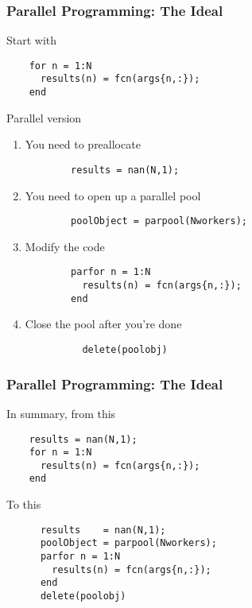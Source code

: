 \documentclass{beamer}
\begin{document}
  \begin{frame}[fragile]
    \frametitle{Parallel Programming: The Ideal}

    Start with
    \begin{lstlisting}
    for n = 1:N
      results(n) = fcn(args{n,:});
    end
    \end{lstlisting}\pause
    Parallel version
    \begin{enumerate}
      \item You need to preallocate
      \begin{lstlisting}
        results = nan(N,1);
      \end{lstlisting}\pause
      \item You need to open up a parallel pool
      \begin{lstlisting}
        poolObject = parpool(Nworkers);
      \end{lstlisting}\pause
      \item Modify the code\pause
        \begin{lstlisting}
        parfor n = 1:N
          results(n) = fcn(args{n,:});
        end
        \end{lstlisting}\pause
      \item Close the pool after you're done
        \begin{lstlisting}
          delete(poolobj)
        \end{lstlisting}
    \end{enumerate}

	\end{frame}


  \begin{frame}[fragile]
    \frametitle{Parallel Programming: The Ideal}

    In summary, from this
    \begin{lstlisting}
    results = nan(N,1);
    for n = 1:N
      results(n) = fcn(args{n,:});
    end
    \end{lstlisting}
    To this
    \begin{lstlisting}
      results    = nan(N,1);
      poolObject = parpool(Nworkers);
      parfor n = 1:N
        results(n) = fcn(args{n,:});
      end
      delete(poolobj)
    \end{lstlisting}
	\end{frame}
\end{document}
